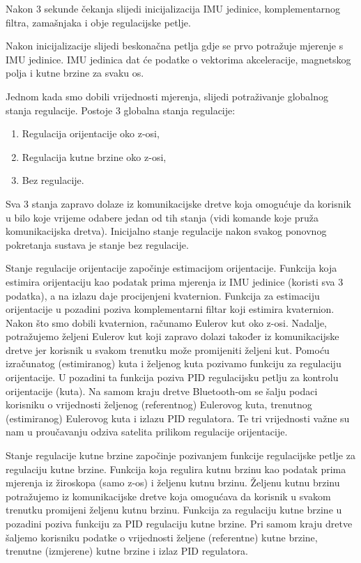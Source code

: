 \documentclass[times, utf8, diplomski, numeric]{templates/template}
\begin{document}
{{{{                Nakon 3 sekunde čekanja slijedi inicijalizacija IMU jedinice, komplementarnog filtra, zamašnjaka i obje regulacijske petlje.

                Nakon inicijalizacije slijedi beskonačna petlja gdje se prvo potražuje mjerenje s IMU jedinice. IMU jedinica dat će podatke o vektorima akceleracije, magnetskog polja i kutne brzine za svaku os. 

                Jednom kada smo dobili vrijednosti mjerenja, slijedi potraživanje globalnog stanja regulacije. Postoje 3 globalna stanja regulacije: 

                \begin{enumerate}
                    \item Regulacija orijentacije oko z-osi,
                    \item Regulacija kutne brzine oko z-osi,
                    \item Bez regulacije.
                \end{enumerate}

                Sva 3 stanja zapravo dolaze iz komunikacijske dretve koja omogućuje da korisnik u bilo koje vrijeme odabere jedan od tih stanja (vidi komande koje pruža komunikacijska dretva). Inicijalno stanje regulacije nakon svakog ponovnog pokretanja sustava je stanje bez regulacije.

                Stanje regulacije orijentacije započinje estimacijom orijentacije. Funkcija koja estimira orijentaciju kao podatak prima mjerenja iz IMU jedinice (koristi sva 3 podatka), a na izlazu daje procijenjeni kvaternion. Funkcija za estimaciju orijentacije u pozadini poziva komplementarni filtar koji estimira kvaternion. Nakon što smo dobili kvaternion, računamo Eulerov kut oko z-osi. Nadalje, potražujemo željeni Eulerov kut koji zapravo dolazi također iz komunikacijske dretve jer korisnik u svakom trenutku može promijeniti željeni kut. Pomoću izračunatog (estimiranog) kuta i željenog kuta pozivamo funkciju za regulaciju orijentacije. U pozadini ta funkcija poziva PID regulacijsku petlju za kontrolu orijentacije (kuta). Na samom kraju dretve Bluetooth-om se šalju podaci korisniku o vrijednosti željenog (referentnog) Eulerovog kuta, trenutnog (estimiranog) Eulerovog kuta i izlazu PID regulatora. Te tri vrijednosti važne su nam u proučavanju odziva satelita prilikom regulacije orijentacije. 

                Stanje regulacije kutne brzine započinje pozivanjem funkcije regulacijske petlje za regulaciju kutne brzine. Funkcija koja regulira kutnu brzinu kao podatak prima mjerenja iz žiroskopa (samo z-os) i željenu kutnu brzinu. Željenu kutnu brzinu potražujemo iz komunikacijske dretve koja omogućava da korisnik u svakom trenutku promijeni željenu kutnu brzinu. Funkcija za regulaciju kutne brzine u pozadini poziva funkciju za PID regulaciju kutne brzine. Pri samom kraju dretve šaljemo korisniku podatke o vrijednosti željene (referentne) kutne brzine, trenutne (izmjerene) kutne brzine i izlaz PID regulatora. 

}}}}
\end{document}
